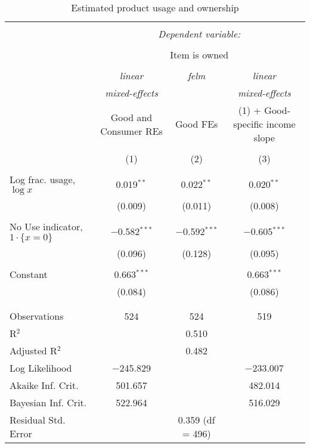 
\begin{table}[!htbp] \centering 
  \caption{Estimated product usage and ownership} 
  \label{tab:ownership} 
\begin{tabular}{@{\extracolsep{5pt}}lccc} 
\\[-1.8ex]\hline 
\hline \\[-1.8ex] 
 & \multicolumn{3}{c}{\textit{Dependent variable:}} \\ 
\cline{2-4} 
\\[-1.8ex] & \multicolumn{3}{c}{Item is owned} \\ 
\\[-1.8ex] & \textit{linear} & \textit{felm} & \textit{linear} \\ 
 & \textit{mixed-effects} & \textit{} & \textit{mixed-effects} \\ 
 & Good and Consumer REs & Good FEs & (1) + Good-specific income slope \\ 
\\[-1.8ex] & (1) & (2) & (3)\\ 
\hline \\[-1.8ex] 
 Log frac. usage, $\log x$ & 0.019$^{**}$ & 0.022$^{**}$ & 0.020$^{**}$ \\ 
  & (0.009) & (0.011) & (0.008) \\ 
  & & & \\ 
 No Use indicator, $1\cdot\{x = 0\}$ & $-$0.582$^{***}$ & $-$0.592$^{***}$ & $-$0.605$^{***}$ \\ 
  & (0.096) & (0.128) & (0.095) \\ 
  & & & \\ 
 Constant & 0.663$^{***}$ &  & 0.663$^{***}$ \\ 
  & (0.084) &  & (0.086) \\ 
  & & & \\ 
\hline \\[-1.8ex] 
Observations & 524 & 524 & 519 \\ 
R$^{2}$ &  & 0.510 &  \\ 
Adjusted R$^{2}$ &  & 0.482 &  \\ 
Log Likelihood & $-$245.829 &  & $-$233.007 \\ 
Akaike Inf. Crit. & 501.657 &  & 482.014 \\ 
Bayesian Inf. Crit. & 522.964 &  & 516.029 \\ 
Residual Std. Error &  & 0.359 (df = 496) &  \\ 

\end{tabular}
\end{table}
